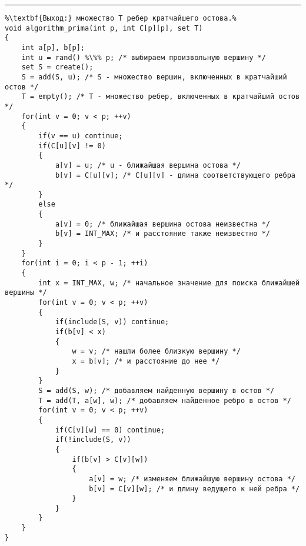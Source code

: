 \documentclass{article}
\begin{document}
\vspace{5pt} \hrule
\begin{lstlisting}[caption={Алгоритм Прима}, label=p330, escapechar=\%]
%\noindent\textbf{Вход:} граф G(V, E), заданный матрицей длин ребер C.\\%
%\textbf{Выход:} множество T ребер кратчайшего остова.%
void algorithm_prima(int p, int C[p][p], set T)
{
	int a[p], b[p];
	int u = rand() %\%% p; /* выбираем произвольную вершину */
	set S = create();
	S = add(S, u); /* S - множество вершин, включенных в кратчайший остов */
	T = empty(); /* T - множество ребер, включенных в кратчайший остов */
	for(int v = 0; v < p; ++v)
	{
		if(v == u) continue;
		if(C[u][v] != 0)
		{
			a[v] = u; /* u - ближайшая вершина остова */
			b[v] = C[u][v]; /* C[u][v] - длина соответствующего ребра */
		}
		else
		{
			a[v] = 0; /* ближайшая вершина остова неизвестна */
			b[v] = INT_MAX; /* и расстояние также неизвестно */
		}
	}
	for(int i = 0; i < p - 1; ++i)
	{
		int x = INT_MAX, w; /* начальное значение для поиска ближайшей вершины */
		for(int v = 0; v < p; ++v)
		{
			if(include(S, v)) continue;
			if(b[v] < x)
			{
				w = v; /* нашли более близкую вершину */
				x = b[v]; /* и расстояние до нее */
			}
		}
		S = add(S, w); /* добавляем найденную вершину в остов */
		T = add(T, a[w], w); /* добавляем найденное ребро в остов */
		for(int v = 0; v < p; ++v)
		{
			if(C[v][w] == 0) continue;
			if(!include(S, v))
			{
				if(b[v] > C[v][w])
				{
					a[v] = w; /* изменяем ближайшую вершину остова */
					b[v] = C[v][w]; /* и длину ведущего к ней ребра */
				}
			}
		}
	}
}
\end{lstlisting}
\end{document}
